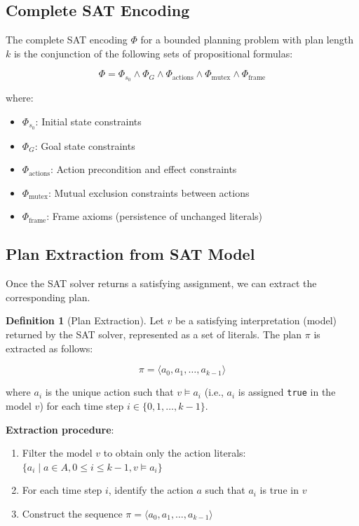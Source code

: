 \documentclass[11pt,a4paper]{article}
\theoremstyle{definition}
\newtheorem{definition}{Definition}[section]
\theoremstyle{plain}
\theoremstyle{remark}
\begin{document}
\subsection{Complete SAT Encoding}

The complete SAT encoding \( \Phi \) for a bounded planning problem with plan length \( k \) is the conjunction of the following sets of propositional formulas:

\[
\Phi = \Phi_{s_0} \land \Phi_G \land \Phi_{\text{actions}} \land \Phi_{\text{mutex}} \land \Phi_{\text{frame}}
\]

where:
\begin{itemize}
    \item \( \Phi_{s_0} \): Initial state constraints
    \item \( \Phi_G \): Goal state constraints
    \item \( \Phi_{\text{actions}} \): Action precondition and effect constraints
    \item \( \Phi_{\text{mutex}} \): Mutual exclusion constraints between actions
    \item \( \Phi_{\text{frame}} \): Frame axioms (persistence of unchanged literals)
\end{itemize}

\subsection{Plan Extraction from SAT Model}

Once the SAT solver returns a satisfying assignment, we can extract the corresponding plan.

\begin{tcolorbox}[colback=teal!10!white,colframe=teal!75!black,title=\textbf{Plan Extraction}]
\begin{definition}[Plan Extraction]
Let \( v \) be a satisfying interpretation (model) returned by the SAT solver, represented as a set of literals. The plan \( \pi \) is extracted as follows:

\[
\pi = \langle a_0, a_1, \dots, a_{k-1} \rangle
\]

where \( a_i \) is the unique action such that \( v \models a_i \) (i.e., \( a_i \) is assigned \texttt{true} in the model \( v \)) for each time step \( i \in \{0, 1, \dots, k-1\} \).
\end{definition}
\end{tcolorbox}

\textbf{Extraction procedure}:
\begin{enumerate}
    \item Filter the model \( v \) to obtain only the action literals: \( \{a_i \mid a \in A, 0 \leq i \leq k-1, v \models a_i\} \)
    \item For each time step \( i \), identify the action \( a \) such that \( a_i \) is true in \( v \)
    \item Construct the sequence \( \pi = \langle a_0, a_1, \dots, a_{k-1} \rangle \)
\end{enumerate}
\end{document}
